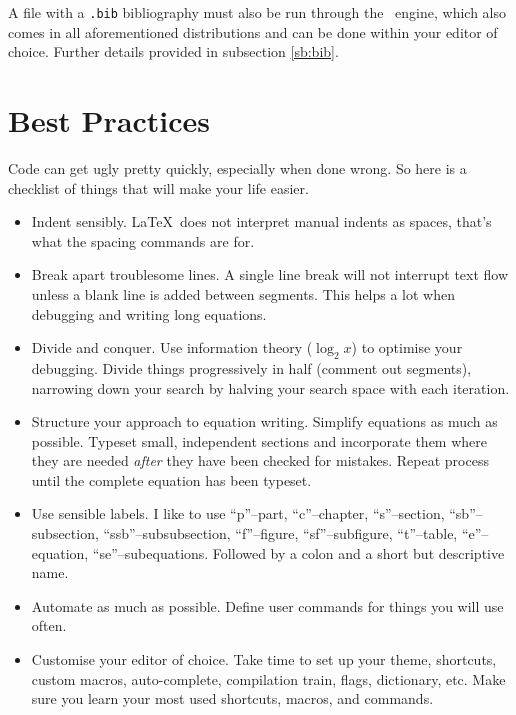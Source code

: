 A file with a \verb|.bib| bibliography must also be run through the \BibTeX~engine, which also comes in all aforementioned distributions and can be done within your editor of choice. Further details provided in subsection \ref{sb:bib}.
%
\section{Best Practices}\label{s:bestpract}
%
Code can get ugly pretty quickly, especially when done wrong. So here is a checklist of things that will make your life easier.
\begin{itemize}
    \item Indent sensibly. \LaTeX~does not interpret manual indents as spaces, that's what the spacing commands are for.
    \item Break apart troublesome lines. A single line break will not interrupt text flow unless a blank line is added between segments. This helps a lot when debugging and writing long equations.
    \item Divide and conquer. Use information theory ($\log_{2} x$) to optimise your debugging. Divide things progressively in half (comment out segments), narrowing down your search by halving your search space with each iteration.
    \item Structure your approach to equation writing. Simplify equations as much as possible. Typeset small, independent sections and incorporate them where they are needed \emph{after} they have been checked for mistakes. Repeat process until the complete equation has been typeset.
    \item Use sensible labels. I like to use ``p''--part, ``c''--chapter, ``s''--section, ``sb''--subsection, ``ssb''--subsubsection, ``f''--figure, ``sf''--subfigure, ``t''--table, ``e''--equation, ``se''--subequations. Followed by a colon and a short but descriptive name.
    \item Automate as much as possible. Define user commands for things you will use often.
    \item Customise your editor of choice. Take time to set up your theme, shortcuts, custom macros, auto-complete, compilation train, flags, dictionary, etc. Make sure you learn your most used shortcuts, macros, and commands.
\end{itemize}
%
